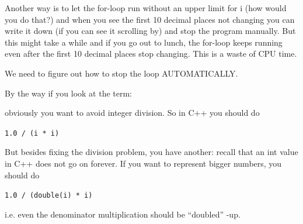 Another way is to let the for-loop run without an upper limit for i (how
would you do that?) and when you see the first 10 decimal places not
changing you can write it down (if you can see it scrolling by) and stop
the program manually. But this might take a while and if you go out to
lunch, the for-loop keeps running even after the first 10 decimal places
stop changing. This is a waste of CPU time.

We need to figure out how to stop the loop AUTOMATICALLY.

By the way if you look at the term:\\

obviously you want to avoid integer division. So in C++ you should do
\begin{center}
    \texttt{1.0 / (i * i)}
\end{center}
But besides fixing the division problem, you have another: recall that
an int value in C++ does not go on forever. If you want to represent
bigger numbers, you should do
\begin{center}
    \texttt{1.0 / (double(i) * i)}
\end{center}
i.e. even the denominator multiplication should be ``doubled'' -up.


